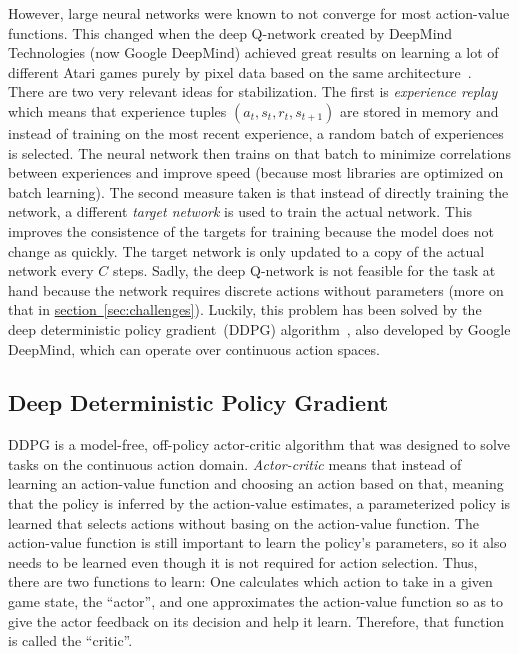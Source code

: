 \documentclass[a4paper,titlepage]{article}
\begin{document}
However, large neural networks were known to not converge for most action-value functions. This changed when the deep Q-network created by DeepMind Technologies (now Google DeepMind) achieved great results on learning a lot of different Atari games purely by pixel data based on the same architecture~\cite{nature}. There are two very relevant ideas for stabilization. The first is \emph{experience replay} which means that experience tuples $(a_t, s_t, r_t, s_{t+1})$ are stored in memory and instead of training on the most recent experience, a random batch of experiences is selected. The neural network then trains on that batch to minimize correlations between experiences and improve speed (because most libraries are optimized on batch learning). The second measure taken is that instead of directly training the network, a different \emph{target network} is used to train the actual network. This improves the consistence of the targets for training because the model does not change as quickly. The target network is only updated to a copy of the actual network every $C$ steps. Sadly, the deep Q-network is not feasible for the task at hand because the network requires discrete actions without parameters (more on that in \hyperref[sec:challenges]{section~\ref*{sec:challenges}}). Luckily, this problem has been solved by the deep deterministic policy gradient~(DDPG) algorithm~\cite{ddpg}, also developed by Google DeepMind, which can operate over continuous action spaces.

\subsection{Deep Deterministic Policy Gradient}

DDPG is a model-free, off-policy actor-critic algorithm that was designed to solve tasks on the continuous action domain. \emph{Actor-critic} means that instead of learning an action-value function and choosing an action based on that, meaning that the policy is inferred by the action-value estimates, a parameterized policy is learned that selects actions without basing on the action-value function. The action-value function is still important to learn the policy's parameters, so it also needs to be learned even though it is not required for action selection. Thus, there are two functions to learn: One calculates which action to take in a given game state, the ``actor'', and one approximates the action-value function so as to give the actor feedback on its decision and help it learn. Therefore, that function is called the ``critic''.
\end{document}
